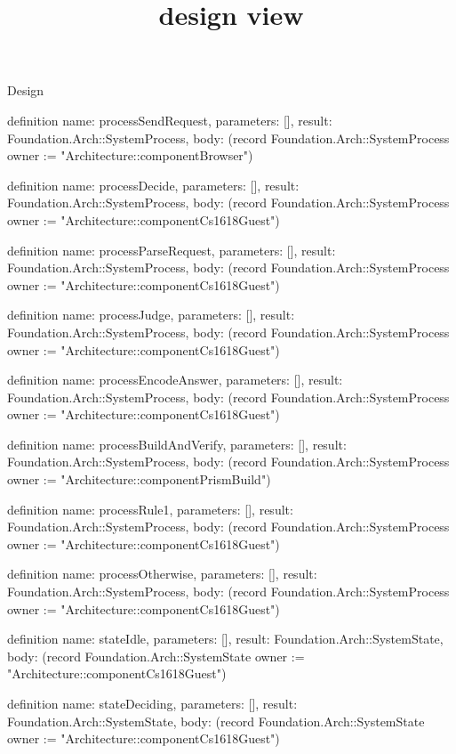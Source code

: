 \begin{lexlean}{Design}
\title{design view}
\begin{semanticmodule}
definition{
  name: processSendRequest,
  parameters: [],
  result: Foundation.Arch::SystemProcess,
  body: (record Foundation.Arch::SystemProcess {owner := "Architecture::componentBrowser"})
}

definition{
  name: processDecide,
  parameters: [],
  result: Foundation.Arch::SystemProcess,
  body: (record Foundation.Arch::SystemProcess {owner := "Architecture::componentCs1618Guest"})
}

definition{
  name: processParseRequest,
  parameters: [],
  result: Foundation.Arch::SystemProcess,
  body: (record Foundation.Arch::SystemProcess {owner := "Architecture::componentCs1618Guest"})
}

definition{
  name: processJudge,
  parameters: [],
  result: Foundation.Arch::SystemProcess,
  body: (record Foundation.Arch::SystemProcess {owner := "Architecture::componentCs1618Guest"})
}

definition{
  name: processEncodeAnswer,
  parameters: [],
  result: Foundation.Arch::SystemProcess,
  body: (record Foundation.Arch::SystemProcess {owner := "Architecture::componentCs1618Guest"})
}

definition{
  name: processBuildAndVerify,
  parameters: [],
  result: Foundation.Arch::SystemProcess,
  body: (record Foundation.Arch::SystemProcess {owner := "Architecture::componentPrismBuild"})
}

definition{
  name: processRule1,
  parameters: [],
  result: Foundation.Arch::SystemProcess,
  body: (record Foundation.Arch::SystemProcess {owner := "Architecture::componentCs1618Guest"})
}

definition{
  name: processOtherwise,
  parameters: [],
  result: Foundation.Arch::SystemProcess,
  body: (record Foundation.Arch::SystemProcess {owner := "Architecture::componentCs1618Guest"})
}

definition{
  name: stateIdle,
  parameters: [],
  result: Foundation.Arch::SystemState,
  body: (record Foundation.Arch::SystemState {owner := "Architecture::componentCs1618Guest"})
}

definition{
  name: stateDeciding,
  parameters: [],
  result: Foundation.Arch::SystemState,
  body: (record Foundation.Arch::SystemState {owner := "Architecture::componentCs1618Guest"})
}


\end{semanticmodule}
\end{lexlean}
